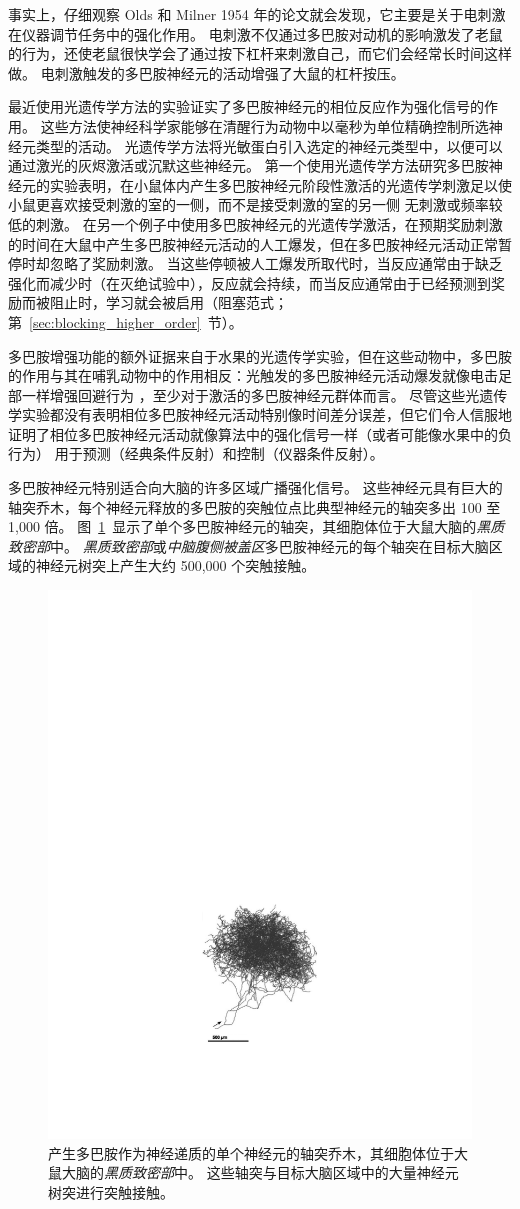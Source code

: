 事实上，仔细观察 Olds 和 Milner 1954 年的论文就会发现，它主要是关于电刺激在仪器调节任务中的强化作用。
电刺激不仅通过多巴胺对动机的影响激发了老鼠的行为，还使老鼠很快学会了通过按下杠杆来刺激自己，而它们会经常长时间这样做。
电刺激触发的多巴胺神经元的活动增强了大鼠的杠杆按压。


最近使用光遗传学方法的实验证实了多巴胺神经元的相位反应作为强化信号的作用。
这些方法使神经科学家能够在清醒行为动物中以毫秒为单位精确控制所选神经元类型的活动。
光遗传学方法将光敏蛋白引入选定的神经元类型中，以便可以通过激光的灰烬激活或沉默这些神经元。
第一个使用光遗传学方法研究多巴胺神经元的实验表明，在小鼠体内产生多巴胺神经元阶段性激活的光遗传学刺激足以使小鼠更喜欢接受刺激的室的一侧，而不是接受刺激的室的另一侧 无刺激或频率较低的刺激\cite{tsai2009phasic}。
在另一个例子中\cite{steinberg2013causal}使用多巴胺神经元的光遗传学激活，在预期奖励刺激的时间在大鼠中产生多巴胺神经元活动的人工爆发，但在多巴胺神经元活动正常暂停时却忽略了奖励刺激。
当这些停顿被人工爆发所取代时，当反应通常由于缺乏强化而减少时（在灭绝试验中），反应就会持续，而当反应通常由于已经预测到奖励而被阻止时，学习就会被启用（阻塞范式； 第~\ref{sec:blocking_higher_order}~节）。


多巴胺增强功能的额外证据来自于水果的光遗传学实验，但在这些动物中，多巴胺的作用与其在哺乳动物中的作用相反：光触发的多巴胺神经元活动爆发就像电击足部一样增强回避行为 ，至少对于激活的多巴胺神经元群体而言\cite{claridge2009writing}。
尽管这些光遗传学实验都没有表明相位多巴胺神经元活动特别像时间差分误差，但它们令人信服地证明了相位多巴胺神经元活动就像算法中的强化信号一样（或者可能像水果中的负行为） 用于预测（经典条件反射）和控制（仪器条件反射）。


多巴胺神经元特别适合向大脑的许多区域广播强化信号。
这些神经元具有巨大的轴突乔木，每个神经元释放的多巴胺的突触位点比典型神经元的轴突多出 100 至 1,000 倍。
图~\ref{fig:12_1}~显示了单个多巴胺神经元的轴突，其细胞体位于大鼠大脑的\textit{黑质致密部}中。
\textit{黑质致密部}或\textit{中脑腹侧被盖区}多巴胺神经元的每个轴突在目标大脑区域的神经元树突上产生大约 500,000 个突触接触。


\begin{figure}[!htb]
	\centering
	\includegraphics[width=0.5\linewidth]{chap12/fig_12_1}
	\caption{产生多巴胺作为神经递质的单个神经元的轴突乔木，其细胞体位于大鼠大脑的\textit{黑质致密部}中。
		这些轴突与目标大脑区域中的大量神经元树突进行突触接触。 \label{fig:12_1}}
\end{figure}


